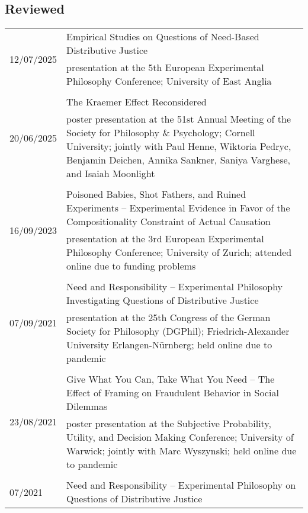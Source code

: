 \documentclass[a4paper,10pt]{article}
\begin{document}
\subsection*{Reviewed}
\begin{longtable}{p{2.5cm}p{11cm}}
\multirow{2}{2.5cm}{\footnotesize{12/07/2025}} & Empirical Studies on Questions of Need-Based Distributive Justice\\
& \footnotesize{presentation at the 5th European Experimental Philosophy Conference; University of East Anglia}\\
\\
\multirow{2}{2.5cm}{\footnotesize{20/06/2025}} & The Kraemer Effect Reconsidered\\
& \footnotesize{poster presentation at the 51st Annual Meeting of the Society for Philosophy \& Psychology; Cornell University; jointly with Paul Henne, Wiktoria Pedryc, Benjamin Deichen, Annika Sankner, Saniya Varghese, and Isaiah Moonlight}\\
\\
\multirow{2}{2.5cm}{\footnotesize{16/09/2023}} & Poisoned Babies, Shot Fathers, and Ruined Experiments -- Experimental Evidence in Favor of the Compositionality Constraint of Actual Causation\\
& \footnotesize{presentation at the 3rd European Experimental Philosophy Conference; University of Zurich; attended online due to funding problems}\\
\\
\multirow{2}{2.5cm}{\footnotesize{07/09/2021}} & Need and Responsibility -- Experimental Philosophy Investigating Questions of Distributive Justice\\
& \footnotesize{presentation at the 25th Congress of the German Society for Philosophy (DGPhil); Friedrich-Alexander University Erlangen-Nürnberg; held online due to pandemic}\\
\\
\multirow{2}{2.5cm}{\footnotesize{23/08/2021}} & Give What You Can, Take What You Need -- The Effect of Framing on Fraudulent Behavior in Social Dilemmas\\
& \footnotesize{poster presentation at the Subjective Probability, Utility, and Decision Making Conference; University of Warwick; jointly with Marc Wyszynski; held online due to pandemic}\\
\\
\multirow{2}{2.5cm}{\footnotesize{07/2021}} & Need and Responsibility -- Experimental Philosophy on Questions of Distributive Justice\\

\end{longtable}
\end{document}
